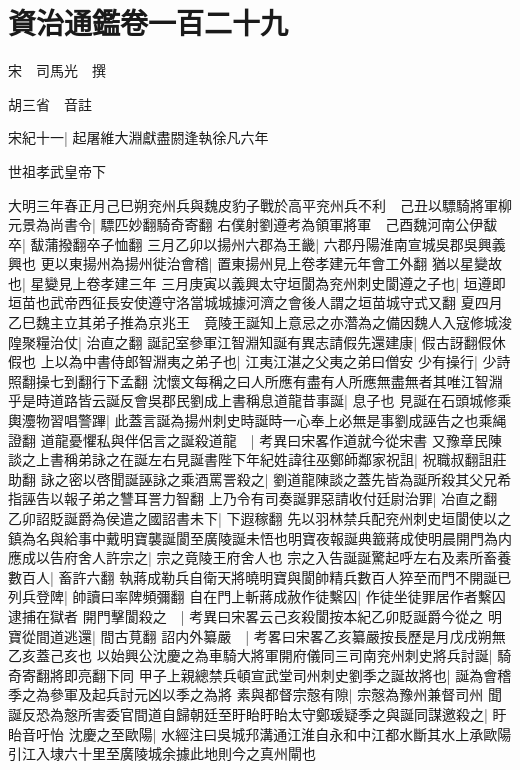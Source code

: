 \section{資治通鑑卷一百二十九}
宋　司馬光　撰

胡三省　音註

宋紀十一|{
	起屠維大淵獻盡閼逢執徐凡六年}


世祖孝武皇帝下

大明三年春正月己巳朔兖州兵與魏皮豹子戰於高平兖州兵不利　己丑以驃騎將軍柳元景為尚書令|{
	驃匹妙翻騎奇寄翻}
右僕射劉遵考為領軍將軍　己酉魏河南公伊馛卒|{
	馛蒲撥翻卒子恤翻}
三月乙卯以揚州六郡為王畿|{
	六郡丹陽淮南宣城吳郡吳興義興也}
更以東揚州為揚州徙治會稽|{
	置東揚州見上卷孝建元年會工外翻}
猶以星變故也|{
	星變見上卷孝建三年}
三月庚寅以義興太守垣閬為兖州刺史閬遵之子也|{
	垣遵即垣苗也武帝西征長安使遵守洛當城城據河濟之會後人謂之垣苗城守式又翻}
夏四月乙巳魏主立其弟子推為京兆王　竟陵王誕知上意忌之亦濳為之備因魏人入寇修城浚隍聚糧治仗|{
	治直之翻}
誕記室參軍江智淵知誕有異志請假先還建康|{
	假古訝翻假休假也}
上以為中書侍郎智淵夷之弟子也|{
	江夷江湛之父夷之弟曰僧安}
少有操行|{
	少詩照翻操七到翻行下孟翻}
沈懷文每稱之曰人所應有盡有人所應無盡無者其唯江智淵乎是時道路皆云誕反會吳郡民劉成上書稱息道龍昔事誕|{
	息子也}
見誕在石頭城修乘輿灋物習唱警蹕|{
	此蓋言誕為揚州刺史時誕時一心奉上必無是事劉成誣告之也乘䋲證翻}
道龍憂懼私與伴侶言之誕殺道龍　|{
	考異曰宋畧作道就今從宋書}
又豫章民陳談之上書稱弟詠之在誕左右見誕書陛下年紀姓諱往巫鄭師鄰家祝詛|{
	祝職叔翻詛莊助翻}
詠之密以啓聞誕誣詠之乘酒罵詈殺之|{
	劉道龍陳談之蓋先皆為誕所殺其父兄希指誣告以報子弟之讐耳詈力智翻}
上乃令有司奏誕罪惡請收付廷尉治罪|{
	冶直之翻}
乙卯詔貶誕爵為侯遣之國詔書未下|{
	下遐稼翻}
先以羽林禁兵配兖州刺史垣閬使以之鎮為名與給事中戴明寶襲誕閬至廣陵誕未悟也明寶夜報誕典籖蔣成使明晨開門為内應成以告府舍人許宗之|{
	宗之竟陵王府舍人也}
宗之入告誕誕驚起呼左右及素所畜養數百人|{
	畜許六翻}
執蔣成勒兵自衛天將曉明寶與閬帥精兵數百人猝至而門不開誕已列兵登陴|{
	帥讀曰率陴頻彌翻}
自在門上斬蔣成赦作徒繫囚|{
	作徒坐徒罪居作者繫囚逮捕在獄者}
開門擊閬殺之　|{
	考異曰宋畧云己亥殺閬按本紀乙卯貶誕爵今從之}
明寶從間道逃還|{
	間古莧翻}
詔内外纂嚴　|{
	考畧曰宋畧乙亥纂嚴按長歷是月戊戌朔無乙亥蓋己亥也}
以始興公沈慶之為車騎大將軍開府儀同三司南兖州刺史將兵討誕|{
	騎奇寄翻將即亮翻下同}
甲子上親總禁兵頓宣武堂司州刺史劉季之誕故將也|{
	誕為會稽季之為參軍及起兵討元凶以季之為將}
素與都督宗慤有隙|{
	宗慤為豫州兼督司州}
聞誕反恐為慤所害委官間道自歸朝廷至盱眙盱眙太守鄭瑗疑季之與誕同謀邀殺之|{
	盱眙音吁怡}
沈慶之至歐陽|{
	水經注曰吳城䢴溝通江淮自永和中江都水斷其水上承歐陽引江入埭六十里至廣陵城余據此地則今之真州閘也}
